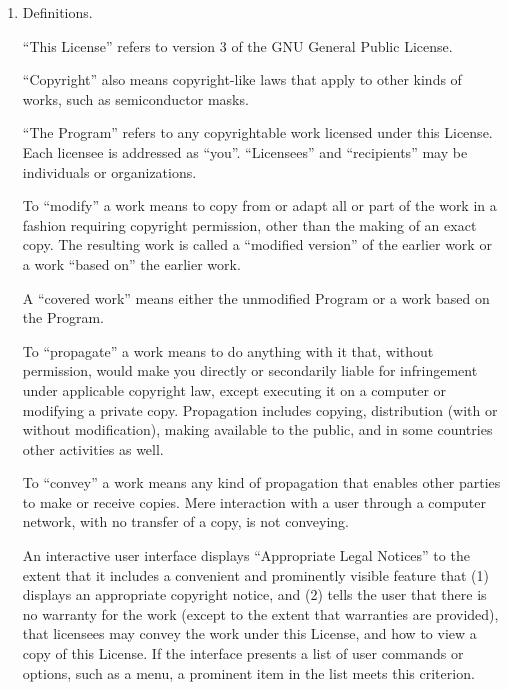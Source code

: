 \documentclass{article}
\begin{document}
    
    \begin{enumerate}
    
    \addtocounter{enumi}{-1}
    
    \item Definitions.
    
    ``This License'' refers to version 3 of the GNU General Public License.
    
    ``Copyright'' also means copyright-like laws that apply to other kinds of
    works, such as semiconductor masks.
    
    ``The Program'' refers to any copyrightable work licensed under this
    License.  Each licensee is addressed as ``you''.  ``Licensees'' and
    ``recipients'' may be individuals or organizations.
    
    To ``modify'' a work means to copy from or adapt all or part of the work
    in a fashion requiring copyright permission, other than the making of an
    exact copy.  The resulting work is called a ``modified version'' of the
    earlier work or a work ``based on'' the earlier work.
    
    A ``covered work'' means either the unmodified Program or a work based
    on the Program.
    
    To ``propagate'' a work means to do anything with it that, without
    permission, would make you directly or secondarily liable for
    infringement under applicable copyright law, except executing it on a
    computer or modifying a private copy.  Propagation includes copying,
    distribution (with or without modification), making available to the
    public, and in some countries other activities as well.
    
    To ``convey'' a work means any kind of propagation that enables other
    parties to make or receive copies.  Mere interaction with a user through
    a computer network, with no transfer of a copy, is not conveying.
    
    An interactive user interface displays ``Appropriate Legal Notices''
    to the extent that it includes a convenient and prominently visible
    feature that (1) displays an appropriate copyright notice, and (2)
    tells the user that there is no warranty for the work (except to the
    extent that warranties are provided), that licensees may convey the
    work under this License, and how to view a copy of this License.  If
    the interface presents a list of user commands or options, such as a
    menu, a prominent item in the list meets this criterion.
    

\end{enumerate}
\end{document}
